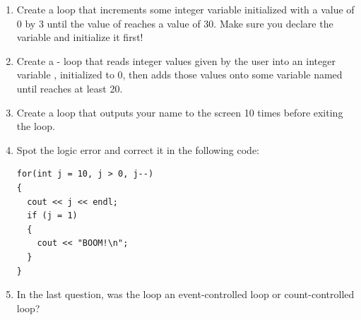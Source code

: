 \begin{enumerate}
\item Create a  loop that increments some integer variable  initialized with a value of 0 by 3 until the value of  reaches a value of 30.
Make sure you declare the variable and initialize it first! 

\item  Create a - loop that reads integer values given by the user into an integer variable , initialized to 0, then adds those values onto some variable named  until  reaches at least 20.

\item Create a  loop that outputs your name to the screen 10 times before exiting the loop.

\item Spot the logic error and correct it in the following code:

\noindent\begin{minipage}{\linewidth}\begin{lstlisting}
for(int j = 10, j > 0, j--)
{
  cout << j << endl;
  if (j = 1)
  {
    cout << "BOOM!\n";
  }
}
\end{lstlisting}\end{minipage}

\item In the last question, was the loop an event-controlled loop or count-controlled loop?
\end{enumerate}


